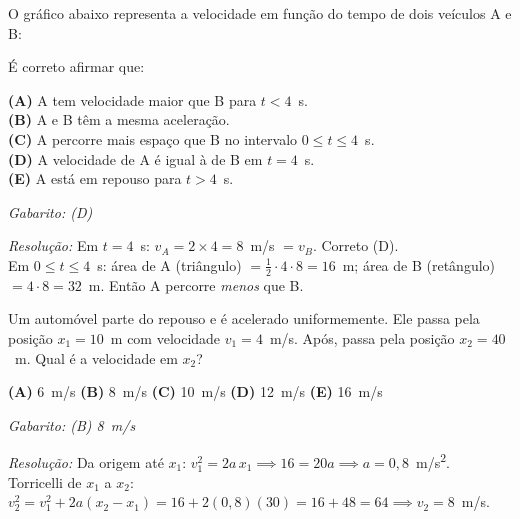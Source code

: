 \documentclass[12pt,a4paper]{article}
\begin{document}
\begin{tcolorbox}[enembox={Quest\~ao 2 --- MRU: Leitura de gr\'afico $v \times t$}]
  O gr\'afico abaixo representa a velocidade em fun\c{c}\~ao do tempo de dois
  ve\'iculos A e B:

  \begin{center}
  \end{center}

  \'E correto afirmar que:

  \smallskip
  \textbf{(A)} A tem velocidade maior que B para $t < 4$~s.\\
  \textbf{(B)} A e B t\^em a mesma acelera\c{c}\~ao.\\
  \textbf{(C)} A percorre mais espa\c{c}o que B no intervalo $0 \leq t \leq 4$~s.\\
  \textbf{(D)} A velocidade de A \'e igual \`a de B em $t = 4$~s.\\
  \textbf{(E)} A est\'a em repouso para $t > 4$~s.

  \medskip
  \textit{Gabarito: (D)}

  \textit{Resolu\c{c}\~ao:} Em $t=4$~s: $v_A = 2\times4 = 8$~m/s $= v_B$. Correto (D).\\
  Em $0 \leq t \leq 4$~s: \'area de A (tri\^angulo) $= \tfrac{1}{2}\cdot4\cdot8 = 16$~m;
  \'area de B (ret\^angulo) $= 4\cdot8 = 32$~m. Ent\~ao A percorre \emph{menos} que B.
\end{tcolorbox}

\begin{tcolorbox}[enembox={Quest\~ao 3 --- MRUV: acelera\c{c}\~ao e Torricelli}]
  Um autom\'ovel parte do repouso e \'e acelerado uniformemente.
  Ele passa pela posi\c{c}\~ao $x_1 = 10$~m com velocidade $v_1 = 4$~m/s.
  Ap\'os, passa pela posi\c{c}\~ao $x_2 = 40$~m.
  Qual \'e a velocidade em $x_2$?

  \medskip
  \textbf{(A)} 6~m/s \quad
  \textbf{(B)} 8~m/s \quad
  \textbf{(C)} 10~m/s \quad
  \textbf{(D)} 12~m/s \quad
  \textbf{(E)} 16~m/s

  \medskip
  \textit{Gabarito: (B) 8~m/s}

  \textit{Resolu\c{c}\~ao:} Da origem at\'e $x_1$:
  $v_1^2 = 2a\,x_1 \implies 16 = 20a \implies a = 0{,}8$~m/s\textsuperscript{2}.\\
  Torricelli de $x_1$ a $x_2$:
  $v_2^2 = v_1^2 + 2a(x_2-x_1) = 16 + 2(0{,}8)(30) = 16+48 = 64
  \implies v_2 = 8$~m/s.
\end{tcolorbox}
\end{document}
